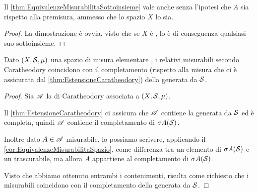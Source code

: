 \begin{corollary}\label{cor:EquivalenzeMisurabilitaSpazio}
	Il \cref{thm:EquivalenzeMisurabilitaSottoinsieme} vale anche senza l'ipotesi che $A$ sia \sigfin[o] rispetto alla premisura, ammesso che lo spazio $X$ lo sia.
\end{corollary}
\begin{proof}
	La dimostrazione è ovvia, visto che se $X$ è \sigfin[o], lo è di conseguenza qualsiasi suo sottoinsieme.
\end{proof}

\begin{proposition}\label{prop:CaratheodoryCompletamentoSigAlg}
	Dato $(X,\S,\mu)$ una spazio di misura elementare \sigfin[o], i relativi misurabili secondo Caratheodory coincidono con il completamento (rispetto alla misura che ci è assicurata dal \cref{thm:EstensioneCaratheodory}) della \sigalg{} generata da $\S$.
\end{proposition}
\begin{proof}
	Sia $\A$ la \sigalg{} di Caratheodory associata a $(X,\S,\mu)$.
	
	Il \cref{thm:EstensioneCaratheodory} ci assicura che $\A$ contiene la \sigalg{} generata da $\S$ ed è completa, quindi $\A$ contiene il completamento di $\sigma A(\S)$.
	
	Inoltre dato $A\in\A$ misurabile, lo possiamo scrivere, applicando il \cref{cor:EquivalenzeMisurabilitaSpazio}, come differenza tra un elemento di $\sigma A(\S)$ e un trascurabile, ma allora $A$ appartiene al completamento di $\sigma A(\S)$.
	
	Visto che abbiamo ottenuto entrambi i contenimenti, risulta come richiesto che i misurabili coincidono con il completamento della \sigalg{} generata da $\S$.
\end{proof}

